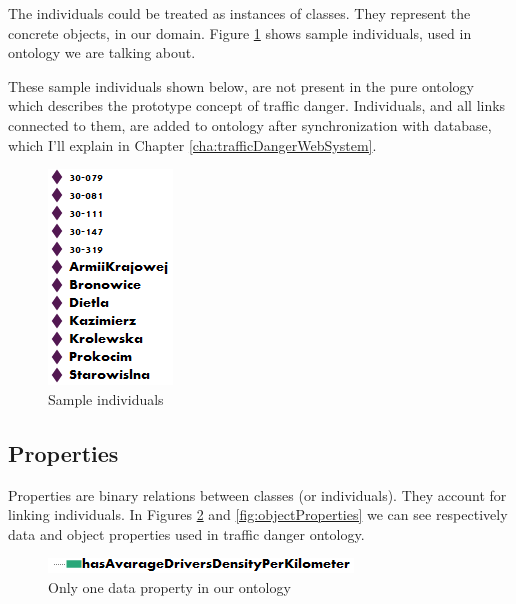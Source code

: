 The individuals could be treated as instances of classes. They represent the concrete objects, in our domain. Figure \ref{fig:individuals} shows sample individuals, used in ontology we are talking about. 

\begin{framed}
\noindent These sample individuals shown below, are not present in the pure ontology which describes the prototype concept of traffic danger. Individuals, and all links connected to them, are added to ontology after synchronization with database, which I'll explain in Chapter \ref{cha:trafficDangerWebSystem}.
\end{framed}

\smallskip

\begin{figure}[htp]
\centering
\includegraphics[scale=0.7]{images/chapter3/Individuals}
\caption{Sample individuals}
\label{fig:individuals}
\end{figure}

\newpage

\subsection{Properties}
\label{sub:properties}

Properties are binary relations between classes (or individuals). They account for linking individuals. In Figures \ref{fig:dataProperties} and \ref{fig:objectProperties} we can see respectively data and object properties used in traffic danger ontology.

\bigskip

\begin{figure}[htp]
\centering
\includegraphics[scale=0.7]{images/chapter3/DataProperties}
\caption{Only one data property in our ontology}
\label{fig:dataProperties}
\end{figure}

